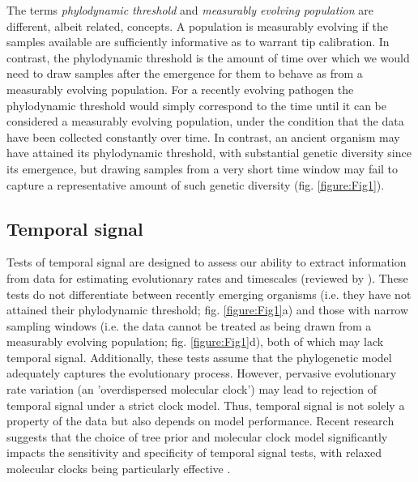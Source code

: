 \documentclass[11pt]{article}
\begin{document}
The terms \textit{phylodynamic threshold} and \textit{measurably evolving population} are different, albeit related, concepts. A population is measurably evolving if the samples available are sufficiently informative as to warrant tip calibration. In contrast, the phylodynamic threshold is the amount of time over which we would need to draw samples after the emergence for them to behave as from a measurably evolving population. For a recently evolving pathogen the phylodynamic threshold would simply correspond to the time until it can be considered a measurably evolving population, under the condition that the data have been collected constantly over time. In contrast, an ancient organism may have attained its phylodynamic threshold, with substantial genetic diversity since its emergence, but drawing samples from a very short time window may fail to capture a representative amount of such genetic diversity (fig. \ref{figure:Fig1}).

\subsection{Temporal signal}
Tests of temporal signal are designed to assess our ability to extract information from data for estimating evolutionary rates and timescales (reviewed by \cite{rieux2016inferences}). These tests do not differentiate between recently emerging organisms (i.e. they have not attained their phylodynamic threshold; fig. \ref{figure:Fig1}a) and those with narrow sampling windows (i.e. the data cannot be treated as being drawn from a measurably evolving population; fig. \ref{figure:Fig1}d), both of which may lack temporal signal. Additionally, these tests assume that the phylogenetic model adequately captures the evolutionary process. However, pervasive evolutionary rate variation (an 'overdispersed molecular clock') may lead to rejection of temporal signal under a strict clock model. Thus, temporal signal is not solely a property of the data but also depends on model performance. Recent research suggests that the choice of tree prior and molecular clock model significantly impacts the sensitivity and specificity of temporal signal tests, with relaxed molecular clocks being particularly effective \citep{tay2024assessing}.
\end{document}
